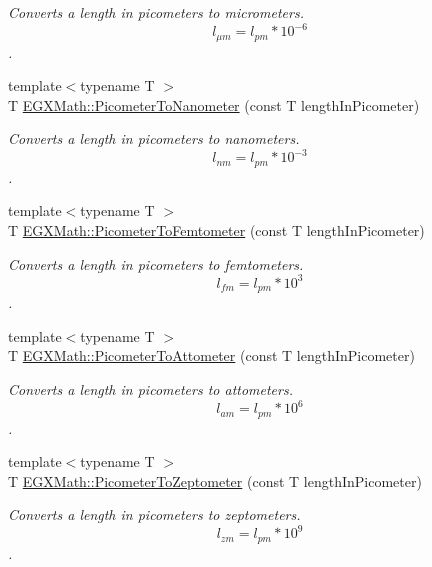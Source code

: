 \begin{DoxyCompactItemize}
\begin{DoxyCompactList}\small\item\em Converts a length in picometers to micrometers. \[ l_{\mu m}=l_{pm} * 10^{-6} \]. \end{DoxyCompactList}\item 
{\footnotesize template$<$typename T $>$ }\\T \mbox{\hyperlink{group___e_g_x_math-_conversions-_length_conversions-_s_i-_picometer-_s_i_gace426a434c0521d391fd15260e33d9f0}{E\+G\+X\+Math\+::\+Picometer\+To\+Nanometer}} (const T length\+In\+Picometer)
\begin{DoxyCompactList}\small\item\em Converts a length in picometers to nanometers. \[ l_{nm}=l_{pm} * 10^{-3} \]. \end{DoxyCompactList}\item 
{\footnotesize template$<$typename T $>$ }\\T \mbox{\hyperlink{group___e_g_x_math-_conversions-_length_conversions-_s_i-_picometer-_s_i_gabdc7e9ceb6baa9da4cee4b791084fb2a}{E\+G\+X\+Math\+::\+Picometer\+To\+Femtometer}} (const T length\+In\+Picometer)
\begin{DoxyCompactList}\small\item\em Converts a length in picometers to femtometers. \[ l_{fm}=l_{pm} * 10^{3} \]. \end{DoxyCompactList}\item 
{\footnotesize template$<$typename T $>$ }\\T \mbox{\hyperlink{group___e_g_x_math-_conversions-_length_conversions-_s_i-_picometer-_s_i_gaa71938201fdcd55422eb1b12de6aa043}{E\+G\+X\+Math\+::\+Picometer\+To\+Attometer}} (const T length\+In\+Picometer)
\begin{DoxyCompactList}\small\item\em Converts a length in picometers to attometers. \[ l_{am}=l_{pm} * 10^{6} \]. \end{DoxyCompactList}\item 
{\footnotesize template$<$typename T $>$ }\\T \mbox{\hyperlink{group___e_g_x_math-_conversions-_length_conversions-_s_i-_picometer-_s_i_ga6aa4200739cdc21650592e995e8945cd}{E\+G\+X\+Math\+::\+Picometer\+To\+Zeptometer}} (const T length\+In\+Picometer)
\begin{DoxyCompactList}\small\item\em Converts a length in picometers to zeptometers. \[ l_{zm}=l_{pm} * 10^{9} \]. \end{DoxyCompactList}\item 

\end{DoxyCompactItemize}
